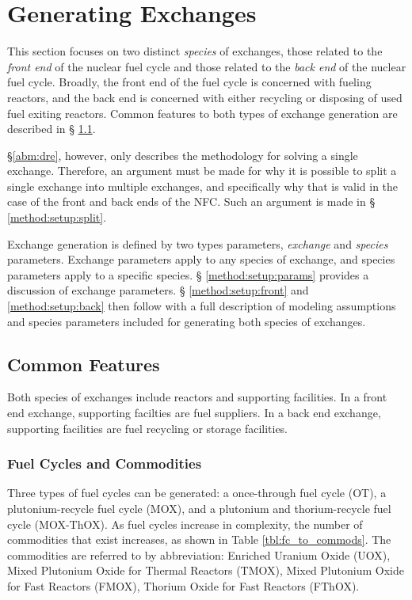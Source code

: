 
\section{Generating Exchanges}\label{method:setup}

This section focuses on two distinct \textit{species} of exchanges, those
related to the \textit{front end} of the nuclear fuel cycle and those related to
the \textit{back end} of the nuclear fuel cycle. Broadly, the front end of the
fuel cycle is concerned with fueling reactors, and the back end is concerned
with either recycling or disposing of used fuel exiting reactors. Common
features to both types of exchange generation are described in \S
\ref{method:setup:features}.

\S \ref{abm:dre}, however, only describes the methodology for solving a single
exchange. Therefore, an argument must be made for why it is possible to split a
single exchange into multiple exchanges, and specifically why that is valid in
the case of the front and back ends of the NFC. Such an argument is made in \S
\ref{method:setup:split}.

Exchange generation is defined by two types parameters, \textit{exchange} and
\textit{species} parameters. Exchange parameters apply to any species of
exchange, and species parameters apply to a specific species. \S
\ref{method:setup:params} provides a discussion of exchange parameters. \S
\ref{method:setup:front} and \ref{method:setup:back} then follow with a full
description of modeling assumptions and species parameters included for
generating both species of exchanges.

\subsection{Common Features}\label{method:setup:features}

Both species of exchanges include reactors and supporting facilities. In a front
end exchange, supporting facilties are fuel suppliers. In a back end exchange,
supporting facilities are fuel recycling or storage facilities. 

\subsubsection{Fuel Cycles and Commodities}

Three types of fuel cycles can be generated: a once-through fuel cycle (OT), a
plutonium-recycle fuel cycle (MOX), and a plutonium and thorium-recycle fuel
cycle (MOX-ThOX). As fuel cycles increase in complexity, the number of
commodities that exist increases, as shown in Table \ref{tbl:fc_to_commods}. The
commodities are referred to by abbreviation: Enriched Uranium Oxide (UOX), Mixed
Plutonium Oxide for Thermal Reactors (TMOX), Mixed Plutonium Oxide for Fast
Reactors (FMOX), Thorium Oxide for Fast Reactors (FThOX).

